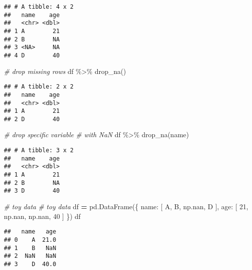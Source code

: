\documentclass[
]{book}
\newenvironment{Shaded}{\begin{snugshade}}{\end{snugshade}}
\newcommand{\CommentTok}[1]{\textcolor[rgb]{0.56,0.35,0.01}{\textit{#1}}}
\newcommand{\DecValTok}[1]{\textcolor[rgb]{0.00,0.00,0.81}{#1}}
\newcommand{\FunctionTok}[1]{\textcolor[rgb]{0.00,0.00,0.00}{#1}}
\newcommand{\NormalTok}[1]{#1}
\newcommand{\OperatorTok}[1]{\textcolor[rgb]{0.81,0.36,0.00}{\textbf{#1}}}
\newcommand{\SpecialCharTok}[1]{\textcolor[rgb]{0.00,0.00,0.00}{#1}}
\newcommand{\StringTok}[1]{\textcolor[rgb]{0.31,0.60,0.02}{#1}}
\begin{document}
\begin{verbatim}
## # A tibble: 4 x 2
##   name    age
##   <chr> <dbl>
## 1 A        21
## 2 B        NA
## 3 <NA>     NA
## 4 D        40
\end{verbatim}

\begin{Shaded}
\begin{Highlighting}[]
\CommentTok{\# drop missing rows}
\NormalTok{df }\SpecialCharTok{\%\textgreater{}\%} \FunctionTok{drop\_na}\NormalTok{()}
\end{Highlighting}
\end{Shaded}

\begin{verbatim}
## # A tibble: 2 x 2
##   name    age
##   <chr> <dbl>
## 1 A        21
## 2 D        40
\end{verbatim}

\begin{Shaded}
\begin{Highlighting}[]
\CommentTok{\# drop specific variable}
\CommentTok{\# with NaN}
\NormalTok{df }\SpecialCharTok{\%\textgreater{}\%} \FunctionTok{drop\_na}\NormalTok{(name)}
\end{Highlighting}
\end{Shaded}

\begin{verbatim}
## # A tibble: 3 x 2
##   name    age
##   <chr> <dbl>
## 1 A        21
## 2 B        NA
## 3 D        40
\end{verbatim}

\begin{Shaded}
\begin{Highlighting}[]
\CommentTok{\# toy data}
\CommentTok{\# toy data}
\NormalTok{df }\OperatorTok{=}\NormalTok{ pd.DataFrame(\{}
    \StringTok{\textquotesingle{}name\textquotesingle{}}\NormalTok{: [}
        \StringTok{\textquotesingle{}A\textquotesingle{}}\NormalTok{, }\StringTok{\textquotesingle{}B\textquotesingle{}}\NormalTok{, np.nan, }\StringTok{\textquotesingle{}D\textquotesingle{}}
\NormalTok{    ],}
    \StringTok{\textquotesingle{}age\textquotesingle{}}\NormalTok{: [}
        \DecValTok{21}\NormalTok{, np.nan, np.nan, }\DecValTok{40}
\NormalTok{    ]    }
\NormalTok{\})}
\NormalTok{df}
\end{Highlighting}
\end{Shaded}

\begin{verbatim}
##   name   age
## 0    A  21.0
## 1    B   NaN
## 2  NaN   NaN
## 3    D  40.0
\end{verbatim}
\end{document}
